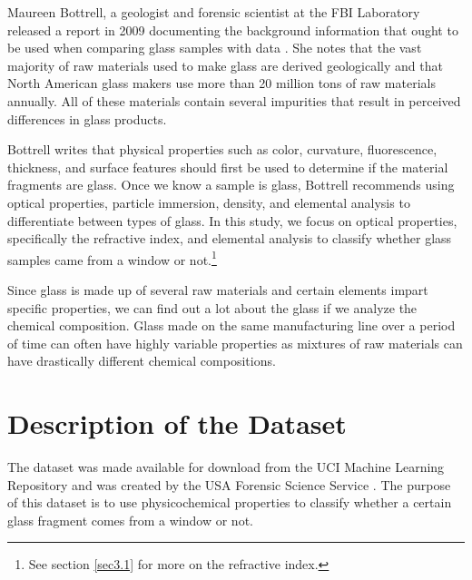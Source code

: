 \documentclass[12pt,halfline,a4paper]{ouparticle}
\begin{document}
Maureen Bottrell, a geologist and forensic scientist at the FBI Laboratory released a report in 2009 documenting the background information that ought to be used when comparing glass samples with data \cite{bottrell2009}. She notes that the vast majority of raw materials used to make glass are derived geologically and that North American glass makers use more than 20 million tons of raw materials annually. All of these materials contain several impurities that result in perceived differences in glass products. 

Bottrell writes that physical properties such as color, curvature, fluorescence, thickness, and surface features should first be used to determine if the material fragments are glass. Once we know a sample is glass, Bottrell recommends using optical properties, particle immersion, density, and elemental analysis to differentiate between types of glass. In this study, we focus on optical properties, specifically the refractive index, and elemental analysis to classify whether glass samples came from a window or not.\footnote{See section \ref{sec3.1} for more on the refractive index.}

Since glass is made up of several raw materials and certain elements impart specific properties, we can find out a lot about the glass if we analyze the chemical composition. Glass made on the same manufacturing line over a period of time can often have highly variable properties as mixtures of raw materials can have drastically different chemical compositions. 

\section{Description of the Dataset}
\label{sec3}
The dataset was made available for download from the UCI Machine Learning Repository and was created by the USA Forensic Science Service \cite{murphy1994}. The purpose of this dataset is to use physicochemical properties to classify whether a certain glass fragment comes from a window or not. 
\end{document}
